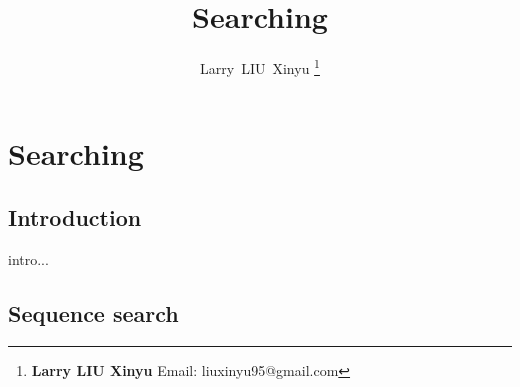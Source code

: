 \documentclass{article}
\begin{document}
\fi


\title{Searching}

\author{Larry~LIU~Xinyu
\thanks{{\bfseries Larry LIU Xinyu } \newline
  Email: liuxinyu95@gmail.com \newline}
  }


\maketitle

\ifx\wholebook\relax
\chapter{Searching}
\fi

\section{Introduction}
\label{introduction} 
intro...

\section{Sequence search}


\end{document}
